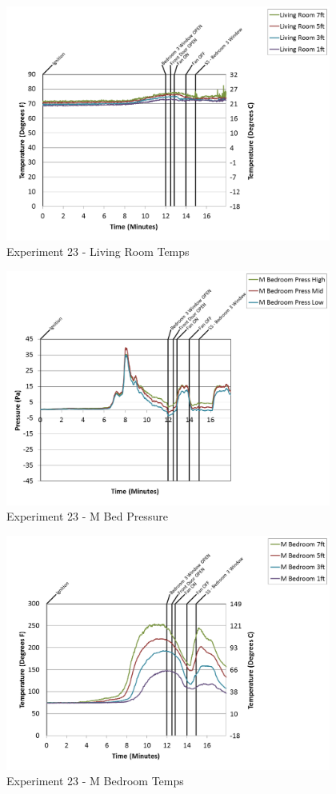 \documentclass{article}
\begin{document}
\begin{appendices}
\clearpage

\begin{figure}[h!]
	\centering
	\includegraphics[height=3.05in]{0_Images/Results_Charts/Exp_23_Charts/LivingRoomTemps.png}
	\caption{Experiment 23 - Living Room Temps}
\end{figure}


\begin{figure}[h!]
	\centering
	\includegraphics[height=3.05in]{0_Images/Results_Charts/Exp_23_Charts/MBedPressure.png}
	\caption{Experiment 23 - M Bed Pressure}
\end{figure}

\clearpage

\begin{figure}[h!]
	\centering
	\includegraphics[height=3.05in]{0_Images/Results_Charts/Exp_23_Charts/MBedroomTemps.png}
	\caption{Experiment 23 - M Bedroom Temps}
\end{figure}



\end{appendices}
\end{document}
